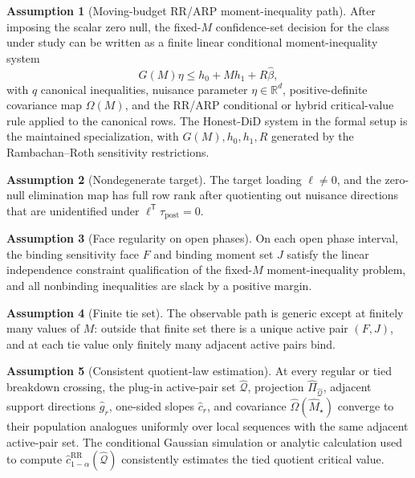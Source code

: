 \documentclass[11pt]{article}
\newcommand{\transpose}{\mathsf{T}}
\theoremstyle{definition}
\newtheorem{assumption}{Assumption}
\theoremstyle{plain}
\theoremstyle{remark}
\begin{document}
\begin{assumption}[Moving-budget RR/ARP moment-inequality path]\label{ass:moving_budget}
After imposing the scalar zero null, the fixed-\(M\) confidence-set decision
for the class under study can be written as a finite linear conditional
moment-inequality system
\[
G(M)\eta \le h_0+Mh_1+R\widehat\beta,
\]
with \(q\) canonical inequalities, nuisance parameter
\(\eta\in\mathbb{R}^d\), positive-definite covariance map \(\Omega(M)\), and
the RR/ARP conditional or hybrid critical-value rule applied to the canonical
rows.  The Honest-DiD system in the formal setup is the maintained
specialization, with \(G(M),h_0,h_1,R\) generated by the
Rambachan--Roth sensitivity restrictions.
\end{assumption}

\begin{assumption}[Nondegenerate target]\label{ass:target}
The target loading \(\ell\neq 0\), and the zero-null elimination map has full
row rank after quotienting out nuisance directions that are unidentified under
\(\ell^\transpose\tau_{\mathrm{post}}=0\).
\end{assumption}

\begin{assumption}[Face regularity on open phases]\label{ass:face_regular}
On each open phase interval, the binding sensitivity face \(F\) and binding
moment set \(J\) satisfy the linear independence constraint qualification of
the fixed-\(M\) moment-inequality problem, and all nonbinding inequalities are
slack by a positive margin.
\end{assumption}

\begin{assumption}[Finite tie set]\label{ass:finite_tie}
The observable path is generic except at finitely many values of \(M\): outside
that finite set there is a unique active pair \((F,J)\), and at each tie value
only finitely many adjacent active pairs bind.
\end{assumption}

\begin{assumption}[Consistent quotient-law estimation]\label{ass:quotient_est}
At every regular or tied breakdown crossing, the plug-in active-pair set
\(\widehat{\mathcal{Q}}\), projection
\(\widehat\Pi_{\widehat{\mathcal{Q}}}\), adjacent support directions
\(\widehat g_r\), one-sided slopes \(\widehat c_r\), and covariance
\(\widehat\Omega(\widehat M_\star)\) converge to their population analogues
uniformly over local sequences with the same adjacent active-pair set.  The
conditional Gaussian simulation or analytic calculation used to compute
\(\widehat c_{1-\alpha}^{\mathrm{RR}}(\widehat{\mathcal{Q}})\) consistently
estimates the tied quotient critical value.
\end{assumption}
\end{document}
